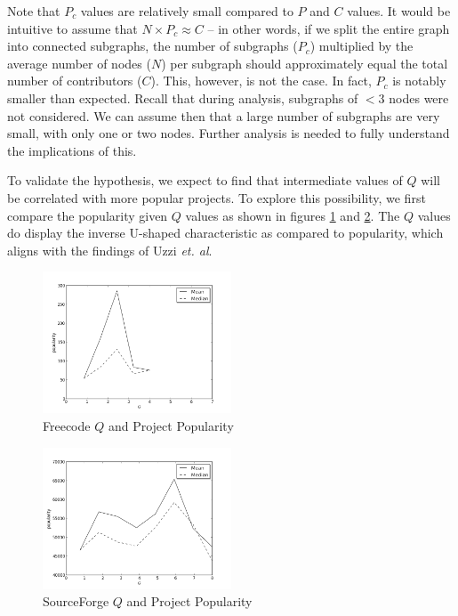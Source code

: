 \documentclass{proc}
\begin{document}
Note that $P_c$ values are relatively small compared to $P$ and $C$ values. It would be intuitive to assume that {$N \times P_c \approx C$} -- in other words, if we split the entire graph into connected subgraphs, the number of subgraphs ($P_c$) multiplied by the average number of nodes ($N$) per subgraph should approximately equal the total number of contributors ($C$). This, however, is not the case. In fact, $P_c$ is notably smaller than expected. Recall that during analysis, subgraphs of {$< 3$} nodes were not considered. We can assume then that a large number of subgraphs are very small, with only one or two nodes. Further analysis is needed to fully understand the implications of this.

To validate the hypothesis, we expect to find that intermediate values of $Q$ will be correlated with more popular projects. To explore this possibility, we first compare the popularity given $Q$ values as shown in figures \ref{fig:q_fc_graph} and \ref{fig:q_sf_graph}. The $Q$ values do display the inverse U-shaped characteristic as compared to popularity, which aligns with the findings of Uzzi \textit{et. al}\cite{uzzi2005collaboration}.

\begin{figure}
\begin{center}
\includegraphics[width=0.5\textwidth]{images/freecode-graph.png}
\end{center}
\caption{Freecode $Q$ and Project Popularity}
\label{fig:q_fc_graph}
\end{figure}

\begin{figure}
\begin{center}
\includegraphics[width=0.5\textwidth]{images/sf-graph.png}
\end{center}
\caption{SourceForge $Q$ and Project Popularity}
\label{fig:q_sf_graph}
\end{figure}
\end{document}
